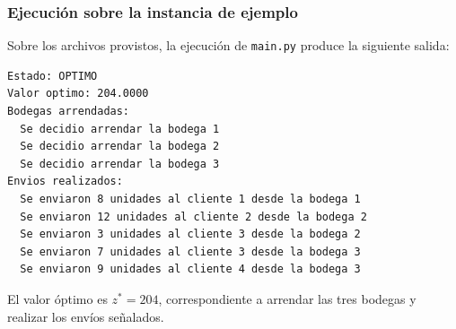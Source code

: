 \documentclass{article}
\begin{document}
\subsubsection*{Ejecuci\'on sobre la instancia de ejemplo}

Sobre los archivos provistos, la ejecuci\'on de \texttt{main.py} produce la siguiente salida:

\begin{lstlisting}[basicstyle=\ttfamily\small,frame=single,backgroundcolor=\color{backcolour}]
Estado: OPTIMO
Valor optimo: 204.0000
Bodegas arrendadas:
  Se decidio arrendar la bodega 1
  Se decidio arrendar la bodega 2
  Se decidio arrendar la bodega 3
Envios realizados:
  Se enviaron 8 unidades al cliente 1 desde la bodega 1
  Se enviaron 12 unidades al cliente 2 desde la bodega 2
  Se enviaron 3 unidades al cliente 3 desde la bodega 2
  Se enviaron 7 unidades al cliente 3 desde la bodega 3
  Se enviaron 9 unidades al cliente 4 desde la bodega 3
\end{lstlisting}

El valor \'optimo es $z^*=204$, correspondiente a arrendar las tres bodegas y realizar los env\'ios se\~nalados.

        
\end{document}
